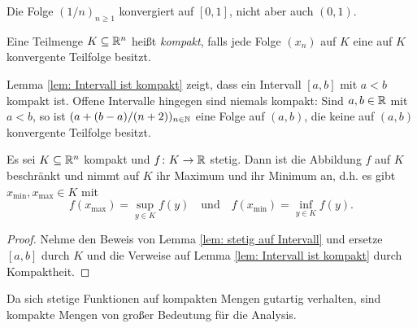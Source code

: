 \documentclass[a4paper,10pt]{article}
\begin{document}
\begin{bsp}
 Die Folge $(1/n)_{n \geq 1}$ konvergiert auf $[0,1]$, nicht aber auch $(0,1)$.
\end{bsp}



\begin{defi}
 Eine Teilmenge $K \subseteq \mathbb{R}^n$ heißt \emph{kompakt}, falls jede Folge $(x_n)$ auf $K$ eine auf $K$ konvergente Teilfolge besitzt.
\end{defi}


\begin{bsp}
 Lemma \ref{lem: Intervall ist kompakt} zeigt, dass ein Intervall $[a,b]$ mit $a < b$ kompakt ist. Offene Intervalle hingegen sind niemals kompakt: Sind $a,b \in \mathbb{R}$ mit $a < b$, so ist $(a + (b-a)/(n+2))_{n \in \mathbb{N}}$ eine Folge auf $(a,b)$, die keine auf $(a,b)$ konvergente Teilfolge besitzt.
\end{bsp}


\begin{prop}
 Es sei $K \subseteq \mathbb{R}^n$ kompakt und $f \colon K \to \mathbb{R}$ stetig. Dann ist die Abbildung $f$ auf $K$ beschränkt und nimmt auf $K$ ihr Maximum und ihr Minimum an, d.h. es gibt $x_{\text{min}}, x_{\text{max}} \in K$ mit
 \[
  f(x_{\text{max}}) = \sup_{y \in K} f(y)
  \quad
  \text{und}
  \quad
  f(x_{\text{min}}) = \inf_{y \in K} f(y).
 \]
\end{prop}
\begin{proof}
 Nehme den Beweis von Lemma \ref{lem: stetig auf Intervall} und ersetze $[a,b]$ durch $K$ und die Verweise auf Lemma \ref{lem: Intervall ist kompakt} durch Kompaktheit.
\end{proof}


Da sich stetige Funktionen auf kompakten Mengen gutartig verhalten, sind kompakte Mengen von großer Bedeutung für die Analysis.
\end{document}
